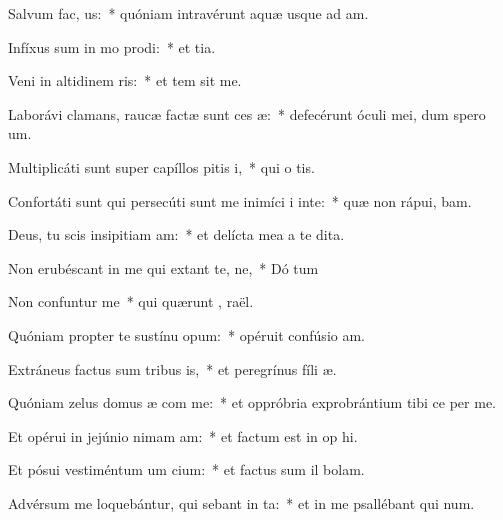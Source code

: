 \item Salvum  fac, us:~* quóniam intravérunt aquæ usque ad  am.
\item Infíxus sum in mo prodi:~* et   tia.
\item Veni in altidinem ris:~* et tem sit me.
\item Laborávi clamans, raucæ factæ sunt ces æ:~* defecérunt óculi mei, dum spero   um.
\item Multiplicáti sunt super capíllos pitis i,~* qui o  tis.
\item Confortáti sunt qui persecúti sunt me inimíci i inte:~* quæ non rápui,  bam.
\item Deus, tu scis insipitiam am:~* et delícta mea a te   dita.
\item Non erubéscant in me qui extant te, ne,~* Dó tum
\item Non confuntur  me~* qui quærunt ,  raël.
\item Quóniam propter te sustínu opum:~* opéruit confúsio  am.
\item Extráneus factus sum tribus is,~* et peregrínus fíli  æ.
\item Quóniam zelus domus æ com me:~* et oppróbria exprobrántium tibi ce per me.
\item Et opérui in jejúnio nimam am:~* et factum est in op hi.
\item Et pósui vestiméntum um cium:~* et factus sum il  bolam.
\item Advérsum me loquebántur, qui sebant in ta:~* et in me psallébant qui  num.
